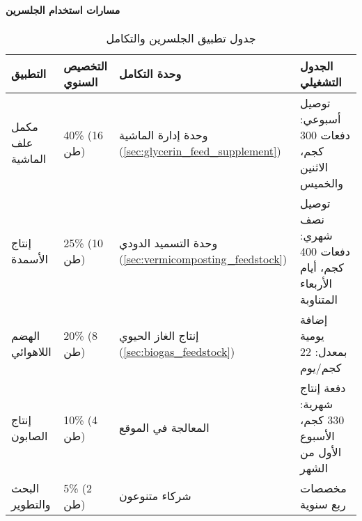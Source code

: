\paragraph{مسارات استخدام الجلسرين}
\label{sec:glycerin_applications}
\begin{table}[h]
\centering
\caption{جدول تطبيق الجلسرين والتكامل}
\label{tab:glycerin_utilization}
\begin{tabular}{|p{2.5cm}|p{2.5cm}|p{3cm}|p{4cm}|}
\hline
\textbf{التطبيق} & \textbf{التخصيص السنوي} & \textbf{وحدة التكامل} & \textbf{الجدول التشغيلي} \\
\hline
مكمل علف الماشية & 40\% (16 طن) & وحدة إدارة الماشية (\ref{sec:glycerin_feed_supplement}) & توصيل أسبوعي: دفعات 300 كجم، الاثنين والخميس \\
\hline
إنتاج الأسمدة & 25\% (10 طن) & وحدة التسميد الدودي (\ref{sec:vermicomposting_feedstock}) & توصيل نصف شهري: دفعات 400 كجم، أيام الأربعاء المتناوبة \\
\hline
الهضم اللاهوائي & 20\% (8 طن) & إنتاج الغاز الحيوي (\ref{sec:biogas_feedstock}) & إضافة يومية بمعدل: 22 كجم/يوم \\
\hline
إنتاج الصابون & 10\% (4 طن) & المعالجة في الموقع & دفعة إنتاج شهرية: 330 كجم، الأسبوع الأول من الشهر \\
\hline
البحث والتطوير & 5\% (2 طن) & شركاء متنوعون & مخصصات ربع سنوية \\
\hline
\end{tabular}
\end{table}

